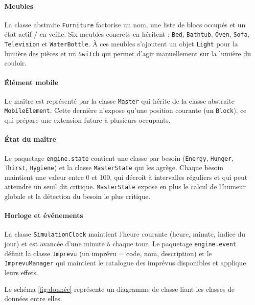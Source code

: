 \paragraph{Meubles} La classe abstraite \texttt{Furniture} factorise un nom, une liste de blocs occupés et un état actif / en veille. Six meubles concrets en héritent : \texttt{Bed}, \texttt{Bathtub}, \texttt{Oven}, \texttt{Sofa}, \texttt{Television} et \texttt{WaterBottle}. À ces meubles s'ajoutent un objet \texttt{Light} pour la lumière des pièces et un \texttt{Switch} qui permet d'agir manuellement sur la lumière du couloir.

\paragraph{Élément mobile} Le maître est représenté par la classe \texttt{Master} qui hérite de la classe abstraite \texttt{MobileElement}. Cette dernière n'expose qu'une position courante (un \texttt{Block}), ce qui prépare une extension future à plusieurs occupants.

\paragraph{État du maître} Le paquetage \texttt{engine.state} contient une classe par besoin (\texttt{Energy}, \texttt{Hunger}, \texttt{Thirst}, \texttt{Hygiene}) et la classe \texttt{MasterState} qui les agrège. Chaque besoin maintient une valeur entre 0 et 100, qui décroît à intervalles réguliers et qui peut atteindre un seuil dit critique. \texttt{MasterState} expose en plus le calcul de l'humeur globale et la détection du besoin le plus critique.

\paragraph{Horloge et événements} La classe \texttt{SimulationClock} maintient l'heure courante (heure, minute, indice du jour) et est avancée d'une minute à chaque tour. Le paquetage \texttt{engine.event} définit la classe \texttt{Imprevu} (un imprévu = code, nom, description) et le \texttt{ImprevuManager} qui maintient le catalogue des imprévus disponibles et applique leurs effets.

Le schéma \ref{fig:donnée} représente un diagramme de classe liant les classes de données entre elles.


